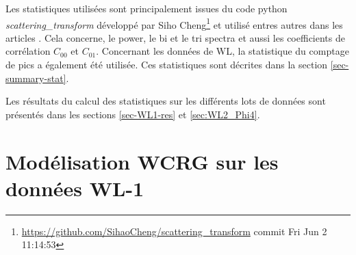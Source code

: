 \documentclass[12pt,twoside]{article}
\begin{document}
Les statistiques utilisées sont principalement issues du code python \textit{scattering\_transform} développé par Siho Cheng\footnote{\url{https://github.com/SihaoCheng/scattering_transform} commit Fri Jun 2 11:14:53}
et utilisé entres autres dans les articles \citep{2021arXiv211201288C, 2023arXiv230617210C}. Cela concerne, le power, le bi et le tri spectra et aussi les coefficients de corrélation $C_{00}$ et $C_{01}$. Concernant les données de WL, la statistique du comptage de pics a également été utilisée. Ces statistiques sont décrites dans la section \ref{sec-summary-stat}.

Les résultats du calcul des statistiques sur les différents lots de données sont présentés dans les sections \ref{sec-WL1-res} et  \ref{sec:WL2_Phi4}.

%
\section{Modélisation WCRG sur les données WL-1}
\label{sec:WL1}
%
\end{document}
